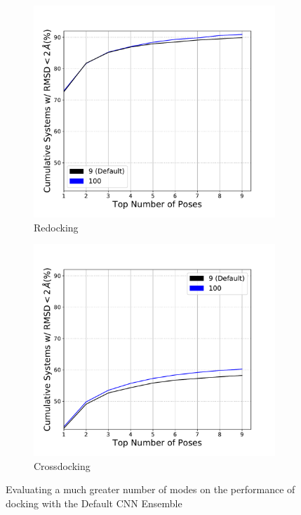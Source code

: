 \documentclass[journal=jcisd8,manuscript=article]{achemso}
\begin{document}
\begin{figure}    
        \begin{subfigure}[b]{0.48\textwidth}    
		\centering
		\includegraphics[width=\textwidth]{figures/redocking/sweep_num_modes_line.pdf}
		\caption{Redocking}
		\label{fig:num modes rd}
        \end{subfigure}    
        \begin{subfigure}[b]{0.48\textwidth}    
		\centering
		\includegraphics[width=\textwidth]{figures/crossdocking/sweep_num_modes_line.pdf}
		\caption{Crossdocking}
		\label{fig:num modes cd}
        \end{subfigure}    
	\caption{Evaluating a much greater number of modes on the performance of docking with the Default CNN Ensemble}
	\label{fig:num modes}
\end{figure}    
\end{document}
